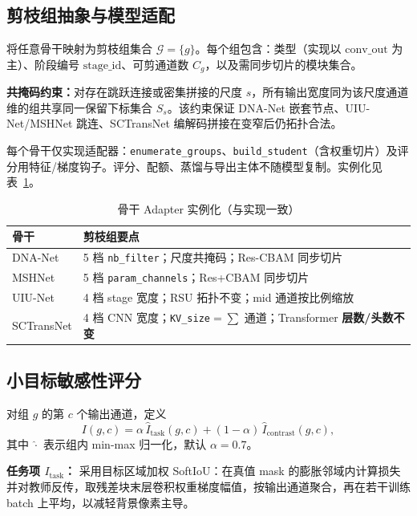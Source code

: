 \documentclass[lettersize,journal]{IEEEtran}
\begin{document}
\subsection{剪枝组抽象与模型适配}
\label{sec:adapter}
将任意骨干映射为剪枝组集合 $\mathcal{G}=\{g\}$。每个组包含：类型（实现以 $\mathrm{conv\_out}$ 为主）、阶段编号 $\mathrm{stage\_id}$、可剪通道数 $C_g$，以及需同步切片的模块集合。

\textbf{共掩码约束：}对存在跳跃连接或密集拼接的尺度 $s$，所有输出宽度同为该尺度通道维的组共享同一保留下标集合 $S_s$。该约束保证 DNA-Net 嵌套节点、UIU-Net/MSHNet 跳连、SCTransNet 编解码拼接在变窄后仍拓扑合法。

每个骨干仅实现适配器：\texttt{enumerate\_groups}、\texttt{build\_student}（含权重切片）及评分用特征/梯度钩子。评分、配额、蒸馏与导出主体不随模型复制。实例化见表~\ref{tab:adapter}。

\begin{table}[!t]
\renewcommand{\arraystretch}{1.15}
\caption{骨干 Adapter 实例化（与实现一致）}
\label{tab:adapter}
\centering
\begin{tabular}{@{}p{2.2cm}p{5.4cm}@{}}
\toprule
骨干 & 剪枝组要点 \\
\midrule
DNA-Net & 5 档 \texttt{nb\_filter}；尺度共掩码；Res-CBAM 同步切片 \\
MSHNet & 5 档 \texttt{param\_channels}；Res+CBAM 同步切片 \\
UIU-Net & 4 档 stage 宽度；RSU 拓扑不变；mid 通道按比例缩放 \\
SCTransNet & 4 档 CNN 宽度；\texttt{KV\_size}$=\sum$ 通道；Transformer \textbf{层数/头数不变} \\
\bottomrule
\end{tabular}
\end{table}

\subsection{小目标敏感性评分}
\label{sec:importance}
对组 $g$ 的第 $c$ 个输出通道，定义
\begin{equation}
\label{eq:I}
I(g,c)=\alpha\,\hat{I}_{\mathrm{task}}(g,c)+(1-\alpha)\,\hat{I}_{\mathrm{contrast}}(g,c),
\end{equation}
其中 $\hat{\cdot}$ 表示组内 min-max 归一化，默认 $\alpha=0.7$。

\textbf{任务项 $I_{\mathrm{task}}$：}
采用目标区域加权 SoftIoU：在真值 mask 的膨胀邻域内计算损失并对教师反传，取残差块末层卷积权重梯度幅值，按输出通道聚合，再在若干训练 batch 上平均，以减轻背景像素主导。
\end{document}
